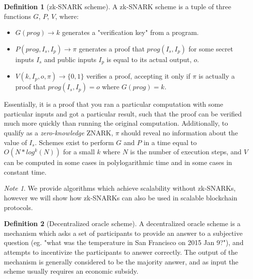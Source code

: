 \documentclass[11pt,a4paper]{article}
\theoremstyle{plain}
\theoremstyle{definition}
\newtheorem{defn}{Definition}[section]
\theoremstyle{remark}
\newtheorem*{note}{Note}
\begin{document}
\begin{defn}[zk-SNARK scheme]
A zk-SNARK scheme is a tuple of three functions $G$, $P$, $V$, where:
\begin{itemize}
\item
$G(prog) \rightarrow k$ generates a "verification key" from a program.
\item
$P(prog, I_s, I_p) \rightarrow \pi$ generates a proof that $prog(I_s, I_p)$ for some secret inputs $I_s$ and public inputs $I_p$ is equal to its actual output, $o$.
\item
$V(k, I_p, o, \pi) \rightarrow \{0, 1\}$ verifies a proof, accepting it only if $\pi$ is actually a proof that $prog(I_s, I_p) = o$ where $G(prog) = k$.
\end{itemize}
Essentially, it is a proof that you ran a particular computation with some particular inputs and got a particular result, such that the proof can be verified much more quickly than running the original computation. Additionally, to qualify as a \emph{zero-knowledge} ZNARK, $\pi$ should reveal no information about the value of $I_s$. Schemes exist \cite{snark} to perform $G$ and $P$ in a time equal to $O(N*log^k(N))$ for a small $k$ where $N$ is the number of execution steps, and $V$ can be computed in some cases in polylogarithmic time and in some cases in constant time.
\end{defn}

\begin{note}
We provide algorithms which achieve scalability without zk-SNARKs, however we will show how zk-SNARKs can also be used in scalable blockchain protocols.
\end{note}

\begin{defn}[Decentralized oracle scheme]
A decentralized oracle scheme is a mechanism which asks a set of participants to provide an answer to a subjective question (eg. "what was the temperature in San Francisco on 2015 Jan 9?"), and attempts to incentivize the participants to answer correctly. The output of the mechanism is generally considered to be the majority answer, and as input the scheme usually requires an economic subsidy.
\end{defn}
\end{document}
